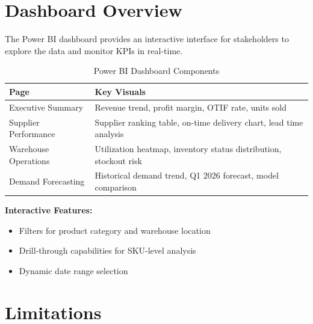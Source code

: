 \documentclass[11pt,a4paper]{article}
\begin{document}
\section{Dashboard Overview}

The Power BI dashboard provides an interactive interface for stakeholders to explore the data and monitor KPIs in real-time.

\begin{table}[H]
\centering
\caption{Power BI Dashboard Components}
\label{tab:dashboard}
\begin{tabular}{@{}ll@{}}
\toprule
\textbf{Page} & \textbf{Key Visuals} \\
\midrule
Executive Summary & Revenue trend, profit margin, OTIF rate, units sold \\
Supplier Performance & Supplier ranking table, on-time delivery chart, lead time analysis \\
Warehouse Operations & Utilization heatmap, inventory status distribution, stockout risk \\
Demand Forecasting & Historical demand trend, Q1 2026 forecast, model comparison \\
\bottomrule
\end{tabular}
\end{table}

\textbf{Interactive Features:}
\begin{itemize}[leftmargin=1.5em]
    \item Filters for product category and warehouse location
    \item Drill-through capabilities for SKU-level analysis
    \item Dynamic date range selection
\end{itemize}

\section{Limitations}
\end{document}
